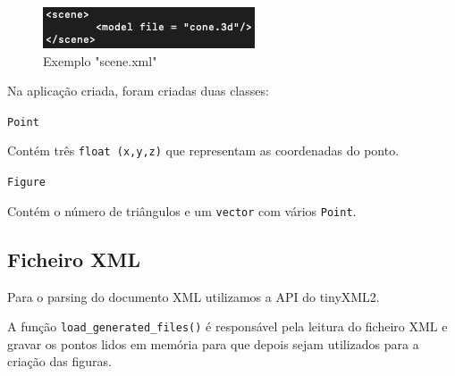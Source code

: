 \documentclass[a4paper]{article}
\begin{document}
\begin{figure}[H]
\centering
\includegraphics[scale=0.70]{scene_xml.png}
\caption{Exemplo "scene.xml"}
\label{img:scene}
\end{figure}

Na aplicação criada, foram criadas duas classes:

\hspace{1cm} \texttt{Point}

\hspace{1cm} Contém três \texttt{float (x,y,z)} que representam as coordenadas do ponto.

\hspace{1cm} \texttt{Figure}

\hspace{1cm} Contém o número de triângulos e um \texttt{vector} com vários \texttt{Point}.  

\subsection{Ficheiro XML}
Para o parsing do documento XML utilizamos a API do tinyXML2.

A função \texttt{load\_generated\_files()} é responsável pela leitura do ficheiro XML e gravar os pontos lidos em memória para que depois sejam utilizados para a criação das figuras.
\end{document}
